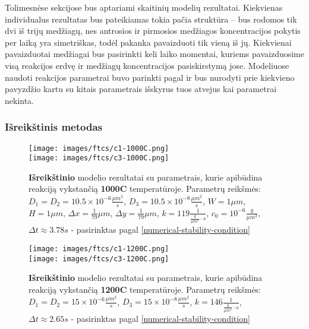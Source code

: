Tolimesnėse sekcijose bus aptariami skaitinių modelių rezultatai. Kiekvienas individualus rezultatas bus pateikiamas tokia pačia struktūra -- bus rodomos tik dvi iš trijų medžiagų, nes antrosios ir pirmosios medžiagos koncentracijos pokytis per laiką yra simetriškas, todėl pakanka pavaizduoti tik vieną iš jų. Kiekvienai pavaizduotai medžiagai bus pasirinkti keli laiko momentai, kuriems pavaizduosime visą reakcijos erdvę ir medžiagų koncentracijos pasiskirstymą jose. Modeliuose naudoti reakcijos parametrai buvo parinkti pagal \cite{mackeviciusCloserLookComputer2012} ir bus nurodyti prie kiekvieno pavyzdžio kartu su kitais parametrais išskyrus tuos atvejus kai parametrai nekinta.

\newpage

\subsubsection{Išreikštinis metodas}

\begin{figure}[h!]
  \centering
  \texttt{[image: images/ftcs/c1-1000C.png]} \\ 
  \texttt{[image: images/ftcs/c3-1000C.png]}
  \caption{\textbf{Išreikštinio} modelio rezultatai su parametrais, kurie apibūdina reakciją vykstančią \textbf{1000\degree C} temperatūroje. Parametrų reikšmės: $D_1 = D_2 = 10.5\times 10^{-6} \frac{\mu m^2}{s}$, $D_3 = 10.5\times 10^{-8} \frac{\mu m^2}{s}$, $W = 1\mu m$, $H = 1\mu m$, $\Delta x = \frac{1}{79}\mu m$, $\Delta y = \frac{1}{79} \mu m$, $k = 119 \frac{1}{ \frac{g}{\mu m^3}\cdot s}$, $c_0 = 10^{-6} \frac{g}{\mu m^3}$, $\Delta t \approx 3.78s$ - pasirinktas pagal \eqref{numerical-stability-condition} }
  \label{fig:ftcs-result-T-1000}
\end{figure}

\begin{figure}[h!]
  \centering
  \texttt{[image: images/ftcs/c1-1200C.png]} \\ 
  \texttt{[image: images/ftcs/c3-1200C.png]}
  \caption{\textbf{Išreikštinio} modelio rezultatai su parametrais, kurie apibūdina reakciją vykstančią \textbf{1200\degree C} temperatūroje. Parametrų reikšmės: $D_1 = D_2 = 15\times 10^{-6} \frac{\mu m^2}{s}$, $D_3 = 15\times 10^{-8} \frac{\mu m^2}{s}$, $k = 146 \frac{1}{ \frac{g}{\mu m^3}\cdot s}$, $\Delta t \approx 2.65s$ - pasirinktas pagal \eqref{numerical-stability-condition} }
  \label{fig:ftcs-result-T-1200}
\end{figure}


